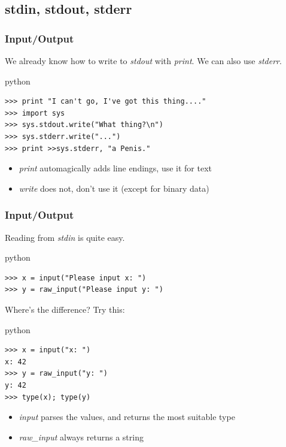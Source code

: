 \documentclass{beamer}
\begin{document}
\subsection{stdin, stdout, stderr}
    
\begin{frame}[fragile]
	\frametitle{Input/Output}
	
	We already know how to write to \emph{stdout} with \emph{print}. We can also use \emph{stderr}.
	\begin{exampleblock}{python}
	\begin{lstlisting}
>>> print "I can't go, I've got this thing...."
>>> import sys
>>> sys.stdout.write("What thing?\n")
>>> sys.stderr.write("...")
>>> print >>sys.stderr, "a Penis."
	\end{lstlisting}
	\end{exampleblock}
\pause
	\begin{itemize}
	\item \emph{print} automagically adds line endings, use it for text
	\item \emph{write} does not, don't use it (except for binary data)
	\end{itemize}
\end{frame}

\begin{frame}[fragile]
	\frametitle{Input/Output}
	
	Reading from \emph{stdin} is quite easy.
	\begin{exampleblock}{python}
	\begin{lstlisting}
>>> x = input("Please input x: ")
>>> y = raw_input("Please input y: ")
	\end{lstlisting}
	\end{exampleblock}
	Where's the difference? Try this:
\pause
	\begin{exampleblock}{python}
	\begin{lstlisting}
>>> x = input("x: ")
x: 42
>>> y = raw_input("y: ")
y: 42
>>> type(x); type(y)
	\end{lstlisting}
	\end{exampleblock}
\pause
	\begin{itemize}
	\item \emph{input} parses the values, and returns the most suitable type
	\item \emph{raw\_input} always returns a string
	\end{itemize}
\end{frame}
\end{document}
